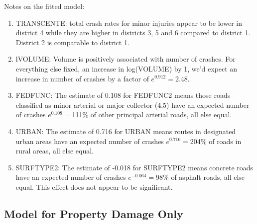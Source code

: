 \documentclass[a4paper]{article}\usepackage[]{graphicx}\usepackage[]{color}
\begin{document}
Notes on the fitted model:

\begin{enumerate}
\item
TRANSCENTE: total crash rates for minor injuries appear to be lower in district 4 while they are higher in districts 3, 5 and 6 compared to district 1. District 2 is comparable to district 1. 

\item
lVOLUME: Volume is positively associated with number of crashes. For everything else fixed, an increase in log(VOLUME) by 1, we'd expect an increase in number of crashes by a factor of $e^{0.912}=$2.48.

\item
FEDFUNC: The estimate of 0.108 for FEDFUNC2 means those roads classified as minor arterial or major collector (4,5) have an expected number of crashes $e^{0.108}=$111\% of other principal arterial roads, all else equal. 


\item
URBAN: The estimate of 0.716 for URBAN means routes in designated urban areas have an expected number of crashes $e^{0.716}=$204\% of roads in rural areas, all else equal.

\item
SURFTYPE2: The estimate of -0.018 for SURFTYPE2 means concrete roads have an expected number of crashes $e^{-0.064}=$98\% of asphalt roads, all else equal. This effect does not appear to be significant.

\end{enumerate}


\clearpage
\subsection{Model for Property Damage Only}
\end{document}
